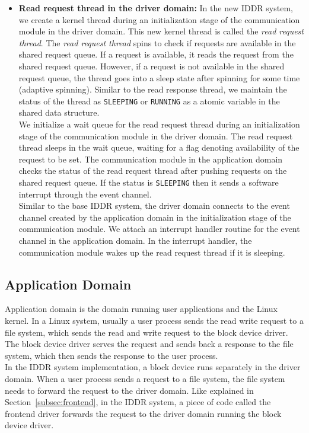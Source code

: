 \begin{itemize}
\item \textbf{Read request thread in the driver domain:}
In the new IDDR system, we create a kernel thread during an initialization stage of the communication module in the driver domain. This new kernel thread is called the \textit{read request thread}. The \textit{read request thread} spins to check if requests are available in the shared request queue. If a request is available, it reads the request from the shared request queue. However, if a request is not available in the shared request queue, the thread goes into a sleep state after spinning for some time (adaptive spinning). Similar to the read response thread, we maintain the status of the thread as \texttt{SLEEPING} or \texttt{RUNNING} as a atomic variable in the shared data structure. 
\\[3mm]
We initialize a wait queue for the read request thread during an initialization stage of the communication module in the driver domain. The read request thread sleeps in the wait queue, waiting for a flag denoting availability of the request to be set. The communication module in the application domain checks the status of the read request thread after pushing requests on the shared request queue. If the status is \texttt{SLEEPING} then it sends a software interrupt through the event channel.
\\[3mm]
Similar to the base IDDR system, the driver domain connects to the event channel created by the application domain in the initialization stage of the communication module. We attach an interrupt handler routine for the event channel in the application domain. In the interrupt handler, the communication module wakes up the read request thread if it is sleeping. 
\end{itemize}

\subsection{Application Domain}

Application domain is the domain running user applications and the Linux kernel. In a Linux system, usually a user process sends the read write request to a file system, which sends the read and write request to the block device driver. The block device driver serves the request and sends back a response to the file system, which then sends the response to the user process. 
\\[3mm]
In the IDDR system implementation, a block device runs separately in the driver domain. When a user process sends a request to a file system, the file system needs to forward the request to the driver domain. Like explained in Section~\ref{subsec:frontend}, in the IDDR system, a piece of code called the frontend driver forwards the request to the driver domain running the block device driver. 

